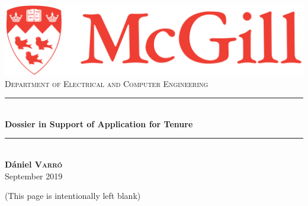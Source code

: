 \documentclass[letter,11pt]{report}
\begin{document}
\begin{titlepage}
\thispagestyle{empty}
\newcommand{\HRule}{\rule{\linewidth}{0.5mm}} %

\center %
 
\includegraphics[width=.5\textwidth]{figures/McGill-logo.png}\\[0.5cm] 

\textsc{\LARGE Department of Electrical and Computer Engineering}\\[3cm] 

\HRule \\[0.4cm]
{ \huge \bfseries Dossier in Support of Application for Tenure}\\[0.4cm] %
\HRule \\[4cm]

{\bfseries\LARGE Dániel \textsc{Varró}}\\[8cm] %


{\Large September 2019}\\[2cm] 

\vfill %
\end{titlepage}

\thispagestyle{empty}
(This page is intentionally left blank)
\newpage

\setcounter{page}{1}
{%
\small
\tableofcontents
}









\appendix





\newpage
\end{document}
